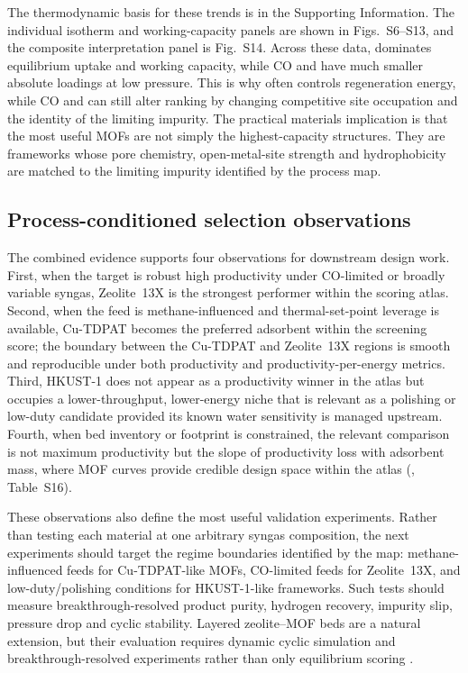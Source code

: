 \documentclass[11pt,a4paper]{article}
\newcommand{\COtwo}{\ce{CO2}}
\newcommand{\CHfour}{\ce{CH4}}
\begin{document}
The thermodynamic basis for these trends is in the Supporting Information. The
individual isotherm and working-capacity panels are shown in Figs.~S6--S13, and
the composite interpretation panel is Fig.~S14. Across these data, \COtwo{}
dominates equilibrium uptake and working capacity, while CO and \CHfour{} have
much smaller absolute loadings at low pressure. This is why \COtwo{} often
controls regeneration energy, while CO and \CHfour{} can still alter ranking by
changing competitive site occupation and the identity of the limiting impurity.
The practical materials implication is that the most useful MOFs are not simply
the highest-capacity structures. They are frameworks whose pore chemistry,
open-metal-site strength and hydrophobicity are matched to the limiting impurity
identified by the process map.


\subsection{Process-conditioned selection observations}
\label{sec:rules}

The combined evidence supports four observations for downstream design work.
First, when the target is robust high productivity under CO-limited or broadly
variable syngas, Zeolite~13X is the strongest performer within the scoring
atlas. Second, when the feed is methane-influenced and thermal-set-point
leverage is available, Cu-TDPAT becomes the preferred adsorbent within the
screening score; the boundary between the Cu-TDPAT and Zeolite~13X regions is
smooth and reproducible under both productivity and productivity-per-energy
metrics. Third, HKUST-1 does not appear as a productivity winner in the atlas
but occupies a lower-throughput, lower-energy niche that is relevant as a
polishing or low-duty candidate provided its known water sensitivity is managed
upstream. Fourth, when bed inventory or footprint is constrained, the relevant
comparison is not maximum productivity but the slope of productivity loss with
adsorbent mass, where MOF curves provide credible design space within the atlas
(, Table~S16).

These observations also define the most useful validation experiments. Rather
than testing each material at one arbitrary syngas composition, the next
experiments should target the regime boundaries identified by the map:
methane-influenced feeds for Cu-TDPAT-like MOFs, CO-limited feeds for
Zeolite~13X, and low-duty/polishing conditions for HKUST-1-like frameworks.
Such tests should measure breakthrough-resolved product purity, hydrogen
recovery, impurity slip, pressure drop and cyclic stability. Layered
zeolite--MOF beds are a natural extension, but their evaluation requires dynamic
cyclic simulation and breakthrough-resolved experiments rather than only
equilibrium scoring
\citep{AlNaddaf2018CoreShell,AlNaddaf2020Multicomponent,Li2014MOFTSA,Rostom2024CuBTC}.
\end{document}
